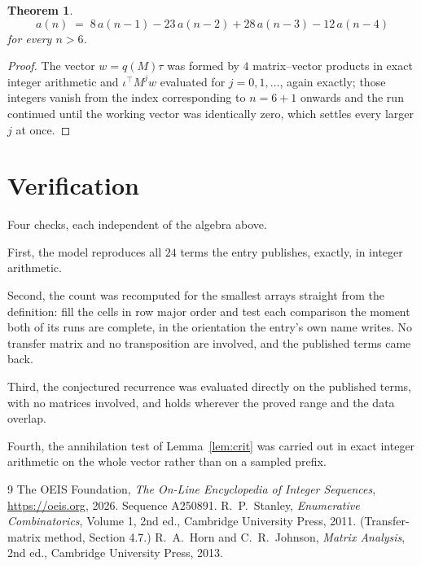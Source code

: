 \documentclass[11pt,a4paper]{article}
\theoremstyle{plain}
\newtheorem{theorem}{Theorem}
\theoremstyle{definition}
\begin{document}
\begin{theorem}
\[
a(n)\;=\;8\,a(n-1) - 23\,a(n-2) + 28\,a(n-3) - 12\,a(n-4)
\]
for every $n>6$.
\end{theorem}

\begin{proof}
The vector $w=q(M)\tau$ was formed by $4$ matrix--vector products in exact integer
arithmetic and $\iota^{\!\top}M^{j}w$ evaluated for $j=0,1,\dots$, again exactly; those
integers vanish from the index corresponding to $n=6+1$ onwards and the run continued
until the working vector was identically zero, which settles every larger $j$ at once.
\end{proof}

\section{Verification}

Four checks, each independent of the algebra above.

First, the model reproduces all $24$ terms the entry publishes, exactly, in integer
arithmetic.

Second, the count was recomputed for the smallest arrays straight from the definition: fill the
cells in row major order and test each comparison the moment both of its runs are complete,
in the orientation the entry's own name writes. No transfer matrix and no transposition are
involved, and the published terms came back.

Third, the conjectured recurrence was evaluated directly on the published terms, with no
matrices involved, and holds wherever the proved range and the data overlap.

Fourth, the annihilation test of Lemma~\ref{lem:crit} was carried out in exact integer
arithmetic on the whole vector rather than on a sampled prefix.

\begin{thebibliography}{9}
 The OEIS Foundation, \emph{The On-Line Encyclopedia of Integer
Sequences}, \url{https://oeis.org}, 2026. Sequence A250891.
 R.~P.~Stanley, \emph{Enumerative Combinatorics}, Volume 1, 2nd ed.,
Cambridge University Press, 2011. (Transfer-matrix method, Section 4.7.)
 R.~A.~Horn and C.~R.~Johnson, \emph{Matrix Analysis}, 2nd ed., Cambridge
University Press, 2013.
\end{thebibliography}
\end{document}
